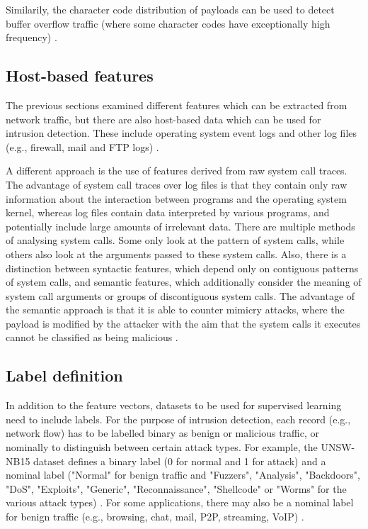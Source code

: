 \documentclass[conference]{IEEEtran}
\begin{document}
Similarily, the character code distribution of payloads can be used to detect buffer overflow traffic (where some character codes have exceptionally high frequency) \cite{waizumi2007}.

\subsection{Host-based features}

The previous sections examined different features which can be extracted from network traffic, but there are also host-based data which can be used for intrusion detection. These include operating system event logs \cite{Ids2018} and other log files (e.g., firewall, mail and FTP logs) \cite{abad2003}.

A different approach is the use of features derived from raw system call traces. The advantage of system call traces over log files is that they contain only raw information about the interaction between programs and the operating system kernel, whereas log files contain data interpreted by various programs, and potentially include large amounts of irrelevant data. There are multiple methods of analysing system calls. Some only look at the pattern of system calls, while others also look at the arguments passed to these system calls. Also, there is a distinction between syntactic features, which depend only on contiguous patterns of system calls, and semantic features, which additionally consider the meaning of system call arguments or groups of discontiguous system calls. The advantage of the semantic approach is that it is able to counter mimicry attacks, where the payload is modified by the attacker with the aim that the system calls it executes cannot be classified as being malicious \cite{creech2014}.

\subsection{Label definition}

In addition to the feature vectors, datasets to be used for supervised learning need to include labels. For the purpose of intrusion detection, each record (e.g., network flow) has to be labelled  binary as benign or malicious traffic, or nominally to distinguish between certain attack types. For example, the UNSW-NB15 dataset defines a binary label (0 for normal and 1 for attack) and a nominal label ("Normal" for benign traffic and "Fuzzers", "Analysis", "Backdoors", "DoS", "Exploits", "Generic", "Reconnaissance", "Shellcode" or "Worms" for the various attack types) \cite{Nb2015}. For some applications, there may also be a nominal label for benign traffic (e.g., browsing, chat, mail, P2P, streaming, VoIP) \cite{lashkari2017} \cite{bagui2017}.
\end{document}
